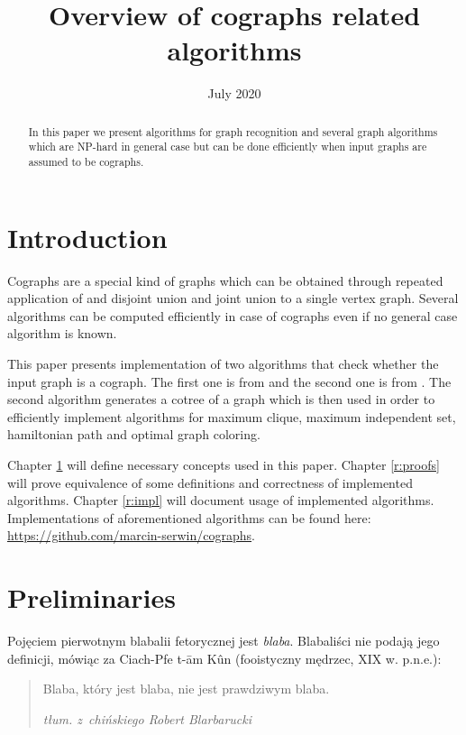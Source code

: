 \documentclass[licencjacka,en]{pracamgr}
\title{Overview of cographs related algorithms}
\date{July 2020}
\begin{document}
\maketitle

\begin{abstract}
  In this paper we present algorithms for graph recognition and several graph algorithms which are NP-hard in general case but can be done efficiently when input graphs are assumed to be cographs.
\end{abstract}

\tableofcontents

\chapter*{Introduction}

Cographs are a special kind of graphs which can be obtained through repeated application of and disjoint union and joint union to a single vertex graph. Several algorithms can be computed efficiently in case of cographs even if no general case algorithm is known.

This paper presents implementation of two algorithms that check whether the input graph is a cograph. The first one is from \cite{habib} and the second one is from \cite{corneil}. The second algorithm generates a cotree of a graph which is then used in order to efficiently implement algorithms for maximum clique, maximum independent set, hamiltonian  path and optimal graph coloring.

Chapter \ref{r:pre} will define necessary concepts used in this paper. Chapter \ref{r:proofs} will prove equivalence of some definitions and correctness of implemented algorithms. Chapter \ref{r:impl} will document usage of implemented algorithms. Implementations of aforementioned algorithms can be found here: \url{https://github.com/marcin-serwin/cographs}.


\chapter{Preliminaries}\label{r:pre}

Pojęciem pierwotnym blabalii fetorycznej jest \emph{blaba}.
Blabaliści nie podają jego definicji, mówiąc za Ciach-Pfe t-\=am
K\^un (fooistyczny mędrzec, XIX w. p.n.e.):
\begin{quote}
  Blaba, który jest blaba, nie jest prawdziwym blaba.

  \raggedleft\slshape tłum. z~chińskiego Robert Blarbarucki
\end{quote}
\end{document}
